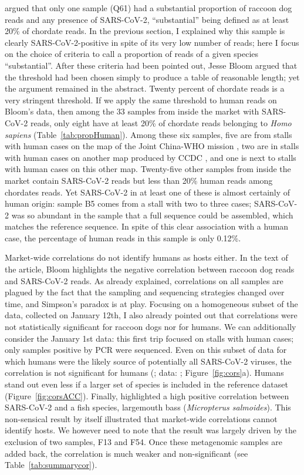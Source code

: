 \documentclass[11pt]{article}
\def \sct {\mbox{SARS-CoV-2}}
\begin{document}
 argued that only one sample (Q61) had a substantial proportion of raccoon dog reads and any presence of \sct{}, ``substantial'' being defined as at least 20\% of chordate reads. In the previous section, I explained why this sample is clearly \sct{}-positive in spite of its very low number of reads; here I focus on the choice of criteria to call a proportion of reads of a given species ``substantial''. After these criteria had been pointed out, Jesse Bloom argued that the threshold had been chosen simply to produce a table of reasonable length; yet the argument remained in the abstract. Twenty percent of chordate reads is a very stringent threshold. If we apply the same threshold to human reads on Bloom's data, then among the 33 samples from inside the market with \sct{} reads, only eight have at least 20\% of chordate reads belonging to \textit{Homo sapiens} (Table~\ref{tab:propHuman}). Among these six samples, five are from stalls with human cases on the map of the Joint China-WHO mission \citep{WHO2021}, two are in stalls with human cases on another map produced by CCDC \citep{Koopmans2021BMJ}, and one is next to stalls with human cases on this other map. Twenty-five other samples from inside the market contain \sct{} reads but less than 20\% human reads among chordates reads. Yet \sct{} in at least one of these is almost certainly of human origin: sample B5 comes from a stall with two to three cases; \sct{} was so abundant in the sample that a full sequence could be assembled, which matches the reference sequence. In spite of this clear association with a human case, the percentage of human reads in this sample is only 0.12\%.
 
Market-wide correlations do not identify humans as hosts either. In the text of the article, Bloom highlights the negative correlation between raccoon dog reads and \sct{} reads. As already explained, correlations on all samples are plagued by the fact that the sampling and sequencing strategies changed over time, and Simpson's paradox is at play. Focusing on a homogeneous subset of the data, collected on January 12th, I also already pointed out that correlations were not statistically significant for raccoon dogs nor for humans. We can additionally consider the January 1st data: this first trip focused on stalls with human cases; only samples positive by PCR were sequenced. Even on this subset of data for which humans were the likely source of potentially all \sct{} viruses, the correlation is not significant for humans (\JBFirstSCHS{}; data: \citet{Bloom2023VE}; Figure~\ref{fig:cors}a). Humans stand out even less if a larger set of species is included in the reference dataset (Figure~\ref{fig:corsACC}). Finally, \citet{Bloom2023VE} highlighted a high positive correlation between \sct{} and a fish species, largemouth bass (\textit{Micropterus salmoides}). This non-sensical result by itself illustrated that market-wide correlations cannot identify hosts. We however need to note that the result was largely driven by the exclusion of two samples, F13 and F54. Once these metagenomic samples are added back, the correlation is much weaker and non-significant (see Table~\ref{tab:summarycor}). 
\end{document}

